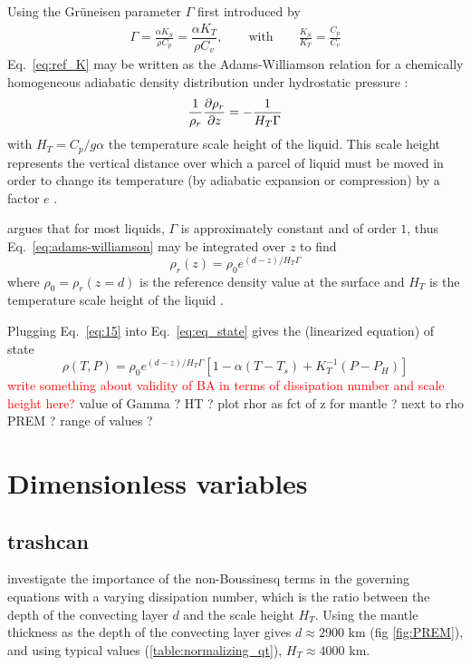 \documentclass[a4paper]{article}
\begin{document}
Using the Grüneisen parameter $\Gamma$ first introduced by \textcite{birc52}
\begin{align}
    \Gamma = \frac{\alpha K_S}{\rho C_p} = \dfrac{\alpha K_T}{\rho C_v},
    \qquad
    \text{with} \qquad
    \frac{K_S}{K_T} = \frac{C_p}{C_v} \label{eq:grun}
\end{align}
Eq.~\eqref{eq:ref_K} may be written as the Adams-Williamson relation for a chemically homogeneous adiabatic density distribution 
under hydrostatic pressure \autocite{birc52}:
 \begin{equation} \label{eq:adams-williamson}
    \frac{1}{\rho_r} \pdv{\rho_r}{z} = -\frac{1}{H_T \Gamma}
\end{equation}
with $H_T = C_p/g\alpha$ the temperature scale height of the liquid. This scale height represents the vertical distance over which a parcel of 
liquid must be moved in order to change its temperature (by adiabatic 
expansion or compression) by a factor $e$ \autocite{jamc80}. 


\textcite{jamc80} argues that for most liquids, $\Gamma$ is approximately constant and of order $1$, thus Eq.~\ref{eq:adams-williamson} may
be integrated over $z$ to find
\begin{equation} \label{eq:15}
    \rho_r(z)= \rho_0 e^{(d-z)/H_T \Gamma}
\end{equation}
where $\rho_0 = \rho_r(z=d)$ is the reference density value at the surface and $H_T$ is the temperature scale height of the liquid \autocite{jamc80}.

Plugging Eq.~\eqref{eq:15} into Eq.~\eqref{eq:eq_state} gives the (linearized equation) of state
\begin{equation} \label{eq:full_eq_state}
    \rho(T,P) = \rho_0 e^{(d-z)/H_T \Gamma}[1-\alpha (T-T_s)+K_T^{-1}(P-P_H)]
\end{equation}
\textcolor{red}{write something about validity of BA in terms of dissipation number and scale height here?}
{\color{red} value of Gamma ? HT ? plot rhor as fct of z for mantle ? next to rho PREM ? range of values ?}



\section{Dimensionless variables}

\subsection{trashcan}
\textcite{jamc80} investigate the importance of the non-Boussinesq terms in the governing equations with a varying dissipation number, which is the ratio between 
the depth of the convecting layer $d$ and the scale height $H_T$. Using the mantle thickness as the depth of the convecting layer gives 
$d \approx 2900$ km (fig \ref{fig:PREM}), 
and using typical values (\ref{table:normalizing_qt}), 
$H_T \approx 4000$ km. 
\end{document}
